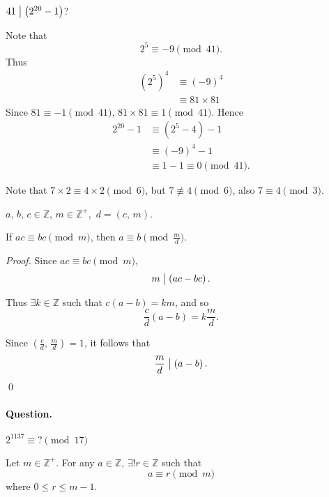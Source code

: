 \begin{example}
    $41 \bigm| \left(2^{20}-1\right)$?

    Note that
    \[
        2^5 \equiv -9 \pmod{41}.  
    \]
    Thus
    \begin{align*}
        \left(2^5\right)^4 &\equiv \left(-9\right)^4 \\
        &\equiv 81 \times 81
    \end{align*}
    Since $81 \equiv -1 \pmod{41}$, $81\times 81 \equiv 1 \pmod{41}$.
    Hence
    \begin{align*}
        2^{20}-1 &\equiv\left(2^5-4\right)-1 \\
        &\equiv \left(-9 \right)^4-1 \\
        &\equiv 1 - 1 \equiv 0 \pmod{41}.
    \end{align*}
\end{example}

Note that $7\times 2 \equiv 4 \times 2\pmod{6}$, but $7 \not\equiv 4\pmod{6}$,
also $7 \equiv 4\pmod{3}$.

\begin{theorem}
    $a,\,b,\,c \in \mathbb{Z}$, $m \in \mathbb{Z}^+$,\, $d=\left(c,\,m\right)$.

    If $ac \equiv bc\pmod{m}$, then $a \equiv b \pmod{\frac{m}{d}}$.
\end{theorem}

\begin{proof}
    Since $ac \equiv bc\pmod{m}$,
    \[
        m \bigm| \left(ac-bc\right).    
    \]

    Thus $\exists k \in \mathbb{Z}$ such that $c\left(a-b\right)=km$,
    and so
    \[
        \frac{c}{d} \left(a-b\right) = k \frac{m}{d}.        
    \]

    Since $\left(\frac{c}{d},\,\frac{m}{d}\right)=1$, it follows that
    \[
        \frac{m}{d} \bigm| \left(a-b\right).    
    \]
    \qed
\end{proof}

\paragraph{Question.} $2^{1137} \equiv \mbox{?}\pmod{17}$

\begin{theorem}
    Let $m\in \mathbb{Z}^+$. For any $a\in \mathbb{Z}$, $\exists! r \in \mathbb{Z}$
    such that
    \[
        a \equiv r \pmod{m}
    \]
    where $0 \leq r \leq m - 1$.
\end{theorem}


